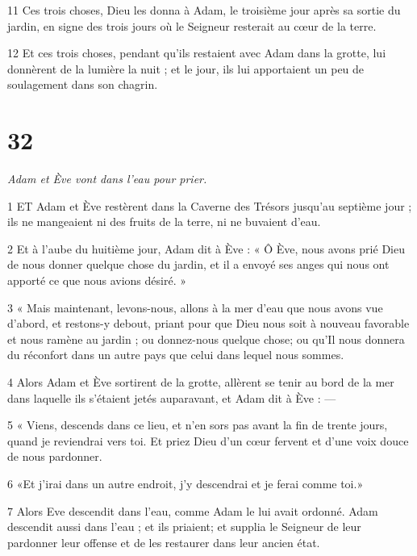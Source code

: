 \par 11 Ces trois choses, Dieu les donna à Adam, le troisième jour après sa sortie du jardin, en signe des trois jours où le Seigneur resterait au cœur de la terre.

\par 12 Et ces trois choses, pendant qu'ils restaient avec Adam dans la grotte, lui donnèrent de la lumière la nuit ; et le jour, ils lui apportaient un peu de soulagement dans son chagrin.

\chapter{32}

\par \textit{Adam et Ève vont dans l'eau pour prier.}

\par 1 ET Adam et Ève restèrent dans la Caverne des Trésors jusqu'au septième jour ; ils ne mangeaient ni des fruits de la terre, ni ne buvaient d'eau.

\par 2 Et à l'aube du huitième jour, Adam dit à Ève : « Ô Ève, nous avons prié Dieu de nous donner quelque chose du jardin, et il a envoyé ses anges qui nous ont apporté ce que nous avions désiré. »

\par 3 « Mais maintenant, levons-nous, allons à la mer d'eau que nous avons vue d'abord, et restons-y debout, priant pour que Dieu nous soit à nouveau favorable et nous ramène au jardin ; ou donnez-nous quelque chose; ou qu'Il nous donnera du réconfort dans un autre pays que celui dans lequel nous sommes.

\par 4 Alors Adam et Ève sortirent de la grotte, allèrent se tenir au bord de la mer dans laquelle ils s'étaient jetés auparavant, et Adam dit à Ève : —

\par 5 « Viens, descends dans ce lieu, et n'en sors pas avant la fin de trente jours, quand je reviendrai vers toi. Et priez Dieu d’un cœur fervent et d’une voix douce de nous pardonner.

\par 6 «Et j'irai dans un autre endroit, j'y descendrai et je ferai comme toi.»

\par 7 Alors Eve descendit dans l'eau, comme Adam le lui avait ordonné. Adam descendit aussi dans l'eau ; et ils priaient; et supplia le Seigneur de leur pardonner leur offense et de les restaurer dans leur ancien état.

